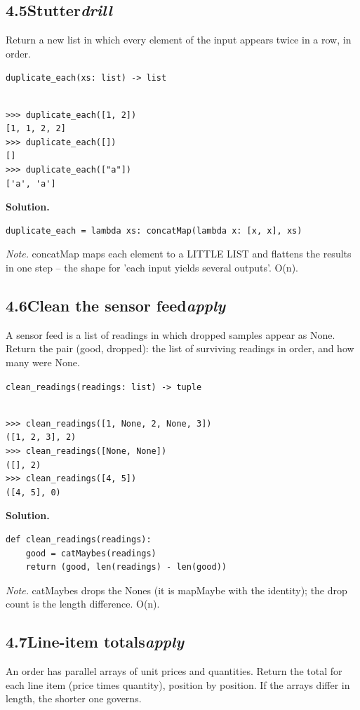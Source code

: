 \documentclass[10pt,letterpaper]{book}
\begin{document}
\subsection*{4.5\quad Stutter\hfill\textnormal{\textit{drill}}}
Return a new list in which every element of the input appears twice in a row, in order.

\noindent\texttt{duplicate\_each(xs: list) -> list}
\begin{lstlisting}[style=ex]

>>> duplicate_each([1, 2])
[1, 1, 2, 2]
>>> duplicate_each([])
[]
>>> duplicate_each(["a"])
['a', 'a']

\end{lstlisting}
\noindent\textbf{Solution.}
\begin{lstlisting}[style=code]
duplicate_each = lambda xs: concatMap(lambda x: [x, x], xs)
\end{lstlisting}
\noindent\textit{Note.} concatMap maps each element to a LITTLE LIST and flattens the results in one step -- the shape for 'each input yields several outputs'. O(n).

\subsection*{4.6\quad Clean the sensor feed\hfill\textnormal{\textit{apply}}}
A sensor feed is a list of readings in which dropped samples appear as None. Return the pair (good, dropped): the list of surviving readings in order, and how many were None.

\noindent\texttt{clean\_readings(readings: list) -> tuple}
\begin{lstlisting}[style=ex]

>>> clean_readings([1, None, 2, None, 3])
([1, 2, 3], 2)
>>> clean_readings([None, None])
([], 2)
>>> clean_readings([4, 5])
([4, 5], 0)

\end{lstlisting}
\noindent\textbf{Solution.}
\begin{lstlisting}[style=code]
def clean_readings(readings):
    good = catMaybes(readings)
    return (good, len(readings) - len(good))
\end{lstlisting}
\noindent\textit{Note.} catMaybes drops the Nones (it is mapMaybe with the identity); the drop count is the length difference. O(n).

\subsection*{4.7\quad Line-item totals\hfill\textnormal{\textit{apply}}}
An order has parallel arrays of unit prices and quantities. Return the total for each line item (price times quantity), position by position. If the arrays differ in length, the shorter one governs.
\end{document}
